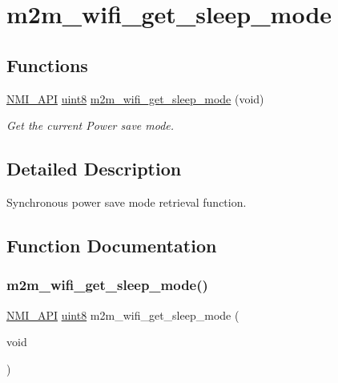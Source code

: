 \hypertarget{group__GetSleepModeFn}{}\section{m2m\+\_\+wifi\+\_\+get\+\_\+sleep\+\_\+mode}
\label{group__GetSleepModeFn}
\subsection*{Functions}
\begin{DoxyCompactItemize}
\item 
\hyperlink{group__BSPDefine_gaecc0323d771e41ef81a76b5f12783e22}{N\+M\+I\+\_\+\+A\+PI} \hyperlink{group__DataT_ga4df709a77647e870bbf1d955b8edc9a6}{uint8} \hyperlink{group__GetSleepModeFn_gae50c5ac6b830890833fcfb6ad910530f}{m2m\+\_\+wifi\+\_\+get\+\_\+sleep\+\_\+mode} (void)
\begin{DoxyCompactList}\small\item\em Get the current Power save mode. \end{DoxyCompactList}\end{DoxyCompactItemize}


\subsection{Detailed Description}
Synchronous power save mode retrieval function. 

\subsection{Function Documentation}
\mbox{\label{group__GetSleepModeFn_gae50c5ac6b830890833fcfb6ad910530f}} 
\subsubsection{\texorpdfstring{m2m\+\_\+wifi\+\_\+get\+\_\+sleep\+\_\+mode()}{m2m\_wifi\_get\_sleep\_mode()}}
{\footnotesize\ttfamily \hyperlink{group__BSPDefine_gaecc0323d771e41ef81a76b5f12783e22}{N\+M\+I\+\_\+\+A\+PI} \hyperlink{group__DataT_ga4df709a77647e870bbf1d955b8edc9a6}{uint8} m2m\+\_\+wifi\+\_\+get\+\_\+sleep\+\_\+mode (\begin{DoxyParamCaption}\item[{void}]{ }\end{DoxyParamCaption})}



